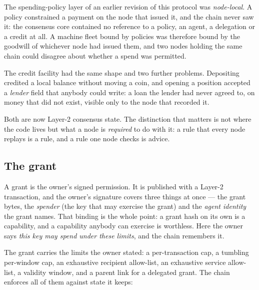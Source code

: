 \documentclass{article}
\begin{document}
The spending-policy layer of an earlier revision of this protocol was
\emph{node-local}. A policy constrained a payment on the node that issued it,
and the chain never saw it: the consensus core contained no reference to a
policy, an agent, a delegation or a credit at all. A machine fleet bound by
policies was therefore bound by the goodwill of whichever node had issued them,
and two nodes holding the same chain could disagree about whether a spend was
permitted.

The credit facility had the same shape and two further problems. Depositing
credited a local balance without moving a coin, and opening a position accepted
a \emph{lender} field that anybody could write: a loan the lender had never
agreed to, on money that did not exist, visible only to the node that recorded
it.

Both are now Layer-2 consensus state. The distinction that matters is not
where the code lives but what a node is \emph{required} to do with it: a rule
that every node replays is a rule, and a rule one node checks is advice.

\subsection{The grant}

A grant is the owner's signed permission. It is published with a Layer-2
transaction, and the owner's signature covers three things at once --- the grant
bytes, the \emph{spender} (the key that may exercise the grant) and the
\emph{agent identity} the grant names. That binding is the whole point: a grant
hash on its own is a capability, and a capability anybody can exercise is
worthless. Here the owner says \emph{this key may spend under these limits},
and the chain remembers it.

The grant carries the limits the owner stated: a per-transaction cap, a
tumbling per-window cap, an exhaustive recipient allow-list, an exhaustive
service allow-list, a validity window, and a parent link for a delegated grant.
The chain enforces all of them against state it keeps:
\end{document}
